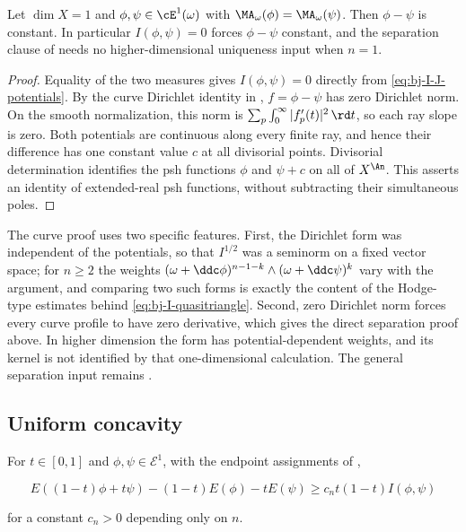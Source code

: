 \begin{proposition}
\label{prop:ch47-curve-uniqueness}
Let $\dim X=1$ and $\phi,\psi\in\cE^1(\omega)$ with
$\MA_\omega(\phi)=\MA_\omega(\psi)$.  Then $\phi-\psi$ is constant.  In
particular $I(\phi,\psi)=0$ forces $\phi-\psi$ constant, and
the separation clause of  needs no
higher-dimensional uniqueness input when $n=1$.
\end{proposition}

\begin{proof}
Equality of the two measures gives $I(\phi,\psi)=0$ directly from
\eqref{eq:bj-I-J-potentials}. By the curve Dirichlet identity in
, $f=\phi-\psi$ has zero Dirichlet norm.
On the smooth normalization, this norm is
$\sum_p\int_0^\infty|f'_p(t)|^2\,\rd t$, so each ray slope is zero.
Both potentials are continuous along every finite ray, and hence their
difference has one constant value $c$ at all divisorial points.
Divisorial determination identifies the psh functions
$\phi$ and $\psi+c$ on all of $X^{\An}$.
This asserts an identity of extended-real psh functions, without
subtracting their simultaneous poles.
\end{proof}

\begin{remark}
\label{rem:ch47-curve-not-general}
The curve proof uses two specific features. First, the Dirichlet
form was independent of the potentials, so that $I^{1/2}$ was a seminorm
on a fixed vector space; for $n\ge2$ the weights
$(\omega+\ddc\phi)^{n-1-k}\wedge(\omega+\ddc\psi)^k$ vary with the
argument, and comparing two such forms is exactly the content of the
Hodge-type estimates behind \eqref{eq:bj-I-quasitriangle}.  Second, zero Dirichlet norm forces every curve profile to have
zero derivative, which gives the direct separation proof above.
In higher dimension the form has potential-dependent weights, and
its kernel is not identified by that one-dimensional calculation.
The general separation input remains
\cite[Corollary~10.4]{BJ22}.
\end{remark}

\subsection{Uniform concavity}
\label{sec:ch47-uniform-concavity}

\begin{theorem}\label{thm:bj-uniform-concavity}
For $t\in[0,1]$ and $\phi,\psi\in\mathcal E^1$,
with the endpoint assignments of ,

\[
 E((1-t)\phi+t\psi)
 -(1-t)E(\phi)-tE(\psi)
 \geq c_n t(1-t)I(\phi,\psi)
\tag{47.9}\label{eq:bj-uniform-concavity}
\]

for a constant $c_n>0$ depending only on $n$.
\end{theorem}

